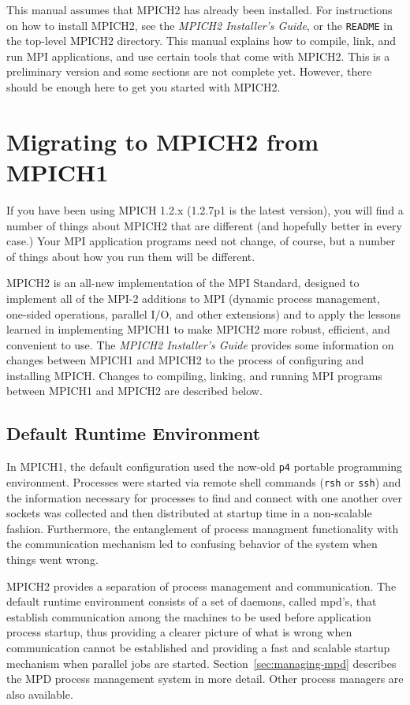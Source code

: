 \documentclass[dvipdfm,11pt]{article}
\begin{document}
This manual assumes that MPICH2 has already been installed.  For
instructions on how to install MPICH2, see the \emph{MPICH2 Installer's Guide},
or the \texttt{README} in the top-level MPICH2 directory.  This manual
explains how to compile, link, and run MPI applications, and use certain
tools that come with MPICH2.  This is a preliminary version and some
sections are not complete yet.  However, there should be enough here to
get you started with MPICH2.


\section{Migrating to MPICH2 from MPICH1}
\label{sec:migrating}

If you have been using MPICH 1.2.x (1.2.7p1 is the latest version), you
will find a number of things about MPICH2 that are different (and
hopefully better in every case.)  Your MPI application programs need not
change, of course, but a number of things about how you run them will be
different.

MPICH2 is an all-new implementation of the MPI Standard, designed to
implement all of the MPI-2 additions to MPI (dynamic process management,
one-sided operations, parallel I/O, and other extensions) and to apply
the lessons learned in implementing MPICH1 to make MPICH2 more robust,
efficient, and convenient to use.  The \emph{MPICH2 Installer's Guide}
provides some information on changes between MPICH1 and MPICH2 to the process
of configuring and installing MPICH.  Changes to compiling, linking, and
running MPI programs between MPICH1 and MPICH2 are described below.


\subsection{Default Runtime Environment}
\label{sec:default-environment}

In MPICH1, the default configuration used the now-old \texttt{p4}
portable programming environment.  Processes were started via remote
shell commands (\texttt{rsh} or \texttt{ssh}) and the information
necessary for processes to find and connect with one another over
sockets was collected and then distributed at startup time in a
non-scalable fashion.  Furthermore, the entanglement of process
managment functionality with the communication mechanism led to
confusing behavior of the system when things went wrong.

MPICH2 provides a separation of process management and communication.
The default runtime environment consists of a set of daemons, called
mpd's, that establish communication among the machines to be used before
application process startup, thus providing a clearer picture of what is
wrong when communication cannot be established and providing a fast and
scalable startup mechanism when parallel jobs are
started. Section~\ref{sec:managing-mpd} describes the MPD process
management system in more detail.  Other process managers are also available.
\end{document}
